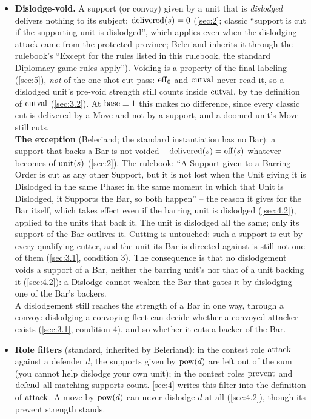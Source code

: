 \documentclass[12pt,a4paper]{article}
\begin{document}
\begin{itemize}
\item \textbf{Dislodge-void.}
A support (or convoy) given by a unit that is \emph{dislodged} delivers nothing to its subject: $\operatorname{delivered}(s) = 0$ (\cref{sec:2}; classic ``support is cut if the supporting unit is dislodged'', which applies even when the dislodging attack came from the protected province; Beleriand inherits it through the rulebook's ``Except for the rules listed in this rulebook, the standard Diplomacy game rules apply'').
Voiding is a property of the final labeling (\cref{sec:5}), \emph{not} of the one-shot cut pass: $\operatorname{eff}_0$ and $\operatorname{cutval}$ never read it, so a dislodged unit's pre-void strength still counts inside $\operatorname{cutval}$, by the definition of $\operatorname{cutval}$ (\cref{sec:3.2}).
At $\operatorname{base} \equiv 1$ this makes no difference, since every classic cut is delivered by a Move and not by a support, and a doomed unit's Move still cuts.\\
\textbf{The exception} (Beleriand; the standard instantiation has no Bar): a support that backs a Bar is not voided -- $\operatorname{delivered}(s) = \operatorname{eff}(s)$ whatever becomes of $\operatorname{unit}(s)$ (\cref{sec:2}).
The rulebook: ``A Support given to a Barring Order is cut as any other Support, but it is not lost when the Unit giving it is Dislodged in the same Phase: in the same moment in which that Unit is Dislodged, it Supports the Bar, so both happen'' -- the reason it gives for the Bar itself, which takes effect even if the barring unit is dislodged (\cref{sec:4.2}), applied to the units that back it.
The unit is dislodged all the same; only its support of the Bar outlives it.
Cutting is untouched: such a support is cut by every qualifying cutter, and the unit its Bar is directed against is still not one of them (\cref{sec:3.1}, condition 3).
The consequence is that no dislodgement voids a support of a Bar, neither the barring unit's nor that of a unit backing it (\cref{sec:4.2}): a Dislodge cannot weaken the Bar that gates it by dislodging one of the Bar's backers.\\
A dislodgement still reaches the strength of a Bar in one way, through a convoy: dislodging a convoying fleet can decide whether a convoyed attacker exists (\cref{sec:3.1}, condition 4), and so whether it cuts a backer of the Bar.
\item \textbf{Role filters} (standard, inherited by Beleriand): in the contest role $\operatorname{attack}$ against a defender $d$, the supports given by $\operatorname{pow}(d)$ are left out of the sum (you cannot help dislodge your own unit); in the contest roles $\operatorname{prevent}$ and $\operatorname{defend}$ all matching supports count.
\cref{sec:4} writes this filter into the definition of $\operatorname{attack}$.
A move by $\operatorname{pow}(d)$ can never dislodge $d$ at all (\cref{sec:4.2}), though its prevent strength stands.
\end{itemize}
\end{document}
